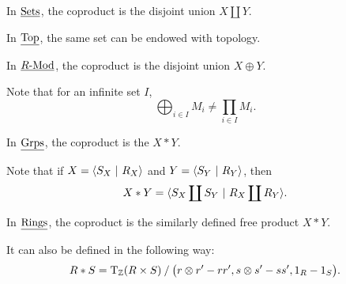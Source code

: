 \begin{examples*}
	\item In \( \underline{\mathrm{Sets}} \), the coproduct is the disjoint union \( X \coprod Y \).
	\item In \( \underline{\mathrm{Top}} \), the same set can be endowed with topology.
	\item In \( \underline{R\text{-}\mathrm{Mod}} \), the coproduct is the disjoint union \( X \oplus Y \).

		Note that for an infinite set \( I \),
		\[
			\bigoplus_{i \in I} M_i \neq \prod_{i \in I} M_i.
		\]

	\item In \( \underline{\mathrm{Grps}} \), the coproduct is the  \( X \ast Y \).

		Note that if \( X = \langle S_X ~|~ R_X \rangle \) and \( Y = \langle S_Y ~|~ R_Y \rangle \), then
		\[
			X \ast Y = \langle S_X \coprod S_Y ~|~ R_X \coprod R_Y \rangle.
		\]

	\item In \( \underline{\mathrm{Rings}} \), the coproduct is the similarly defined free product \( X \ast Y \).

		It can also be defined in the following way:
		\[
			R \ast S = \operatorname{T}_\mathbb{Z}(R \times S) \:/\: \bigl(r \otimes r' - r r', s \otimes s' - s s', 1_R - 1_S\bigr).
		\]
\end{examples*}